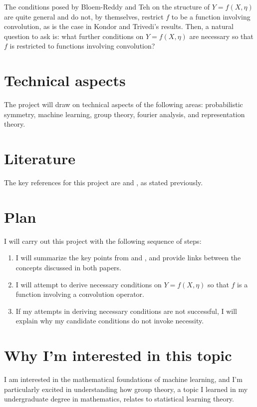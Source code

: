 \documentclass[]{STAT_547C}
\begin{document}
The conditions posed by Bloem-Reddy and Teh on the structure of $Y = f(X, \eta)$ are quite general and do not, by themselves, restrict $f$ to be a function involving convolution, as is the case in Kondor and Trivedi's results.
Then, a natural question to ask is: what further conditions on $Y = f(X, \eta)$ are necessary so that $f$ is restricted to functions involving convolution?
\section{Technical aspects}

The project will draw on technical aspects of the following areas: probabilistic symmetry, machine learning, group theory, fourier analysis, and representation theory.


\section{Literature}

The key references for this project are \cite{kondor2018generalization} and \cite{bloemreddy2019probabilistic}, as stated previously.


\section{Plan}

I will carry out this project with the following sequence of steps: 
\begin{enumerate}
  \item I will summarize the key points from \cite{bloemreddy2019probabilistic} and \cite{kondor2018generalization}, and provide links between the concepts discussed in both papers.
  \item I will attempt to derive necessary conditions on $Y = f(X, \eta)$ so that $f$ is a function involving a convolution operator. 
  \item If my attempts in deriving necessary conditions are not successful, I will explain why my candidate conditions do not invoke necessity.
\end{enumerate}


\section{Why I'm interested in this topic}

I am interested in the mathematical foundations of machine learning, and I'm particularly excited in understanding how group theory, a topic I learned in my undergraduate degree in mathematics, relates to statistical learning theory.


\printbibliography
\end{document}
